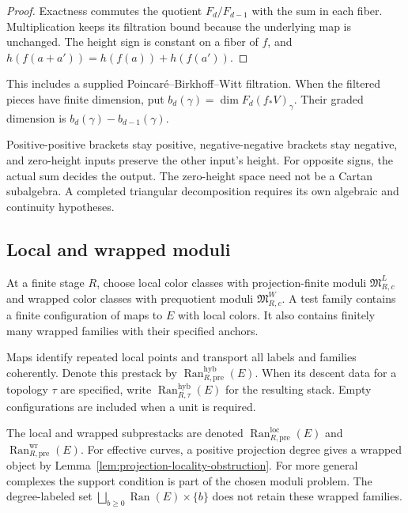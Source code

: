 \begin{proof}
Exactness commutes the quotient $F_d/F_{d-1}$ with the sum in each
fiber.  Multiplication keeps its filtration bound because the
underlying map is unchanged.  The height sign is constant on a fiber
of $f$, and $h(f(a+a'))=h(f(a))+h(f(a'))$.
\end{proof}

This includes a supplied Poincar\'e--Birkhoff--Witt filtration.
When the filtered pieces have finite dimension, put
$b_d(\gamma)=\dim F_d(f_*V)_\gamma$.  Their graded dimension is
$b_d(\gamma)-b_{d-1}(\gamma)$.

Positive-positive brackets stay
positive, negative-negative brackets stay negative, and zero-height
inputs preserve the other input's height.  For opposite signs, the
actual sum decides the output.  The zero-height space need not be
a Cartan subalgebra.  A completed triangular decomposition requires
its own algebraic and continuity hypotheses.

\subsection{Local and wrapped moduli}
\label{subsec:hybrid-carrier-definition}

\begin{definition}
\label{def:hybrid-ran-carrier}
At a finite stage $R$, choose local color classes with projection-finite
moduli $\mathfrak M^{L}_{R,c}$ and wrapped color classes with
prequotient moduli $\mathfrak M^{W}_{R,c}$.  A test family contains a finite configuration of maps to $E$ with
local colors.  It also contains finitely many wrapped families
with their specified anchors.

Maps identify repeated local
points and transport all labels and families coherently.  Denote this
prestack by $\operatorname{Ran}^{\mathrm{hyb}}_{R,\mathrm{pre}}(E)$.
When its descent data for a topology $\tau$ are specified, write
$\operatorname{Ran}^{\mathrm{hyb}}_{R,\tau}(E)$ for the resulting
stack.  Empty configurations are included when a unit is required.
\end{definition}

The local and wrapped subprestacks are denoted
$\operatorname{Ran}^{\mathrm{loc}}_{R,\mathrm{pre}}(E)$ and
$\operatorname{Ran}^{\mathrm{wr}}_{R,\mathrm{pre}}(E)$.
For effective curves, a positive projection degree gives a wrapped
object by Lemma~\ref{lem:projection-locality-obstruction}.
For more general complexes the support condition is part of the
chosen moduli problem.  The degree-labeled set
$\bigsqcup_{b\ge0}\operatorname{Ran}(E)\times\{b\}$ does not retain
these wrapped families.

